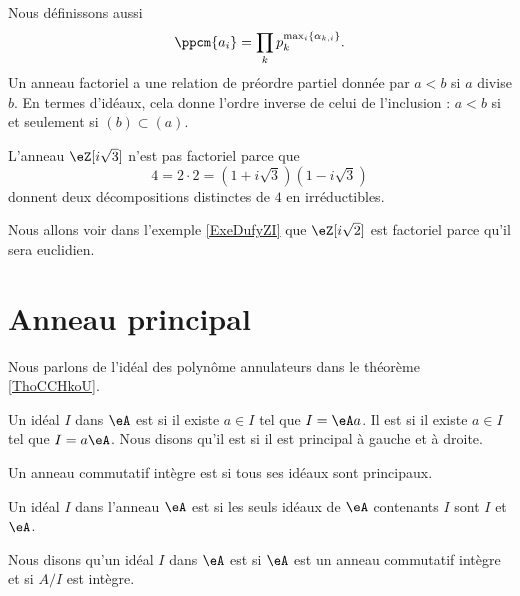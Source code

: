 Nous définissons aussi
\begin{equation}
    \ppcm\{ a_i \}=\prod_kp_k^{\max_i\{ \alpha_{k,i} \}}.
\end{equation}
Un anneau factoriel a une relation de préordre partiel donnée par \( a<b\) si \( a\) divise \( b\). En termes d'idéaux, cela donne l'ordre inverse de celui de l'inclusion : \( a<b\) si et seulement si \( (b)\subset (a)\).

\begin{example}
    L'anneau \( \eZ[i\sqrt{3}]\) n'est pas factoriel parce que
    \begin{equation}
        4=2\cdot 2=(1+i\sqrt{3})(1-i\sqrt{3})
    \end{equation}
    donnent deux décompositions distinctes de \( 4\) en irréductibles.
\end{example}
Nous allons voir dans l'exemple \ref{ExeDufyZI} que \( \eZ[i\sqrt{2}]\) est factoriel parce qu'il sera euclidien.

\section{Anneau principal}

Nous parlons de l'idéal des polynôme annulateurs dans le théorème \ref{ThoCCHkoU}.

\begin{definition}      \label{DefIdPrinpuMrbOq}
    Un idéal \( I\) dans \(\eA\) est  si il existe \( a\in I\) tel que \( I=\eA a\). Il est  si il existe \( a\in I\) tel que \( I=a\eA\). Nous disons qu'il est  si il est principal à gauche et à droite.

    Un anneau commutatif intègre est  si tous ses idéaux sont principaux.
\end{definition}

Un idéal \( I\) dans l'anneau \( \eA\) est  si les seuls idéaux de \( \eA\) contenants \( I\) sont \( I\) et \( \eA\).


\begin{definition}
    Nous disons qu'un idéal \( I\) dans \( \eA\) est  si \( \eA\) est un anneau commutatif intègre et si \( A/I\) est intègre.
\end{definition}

